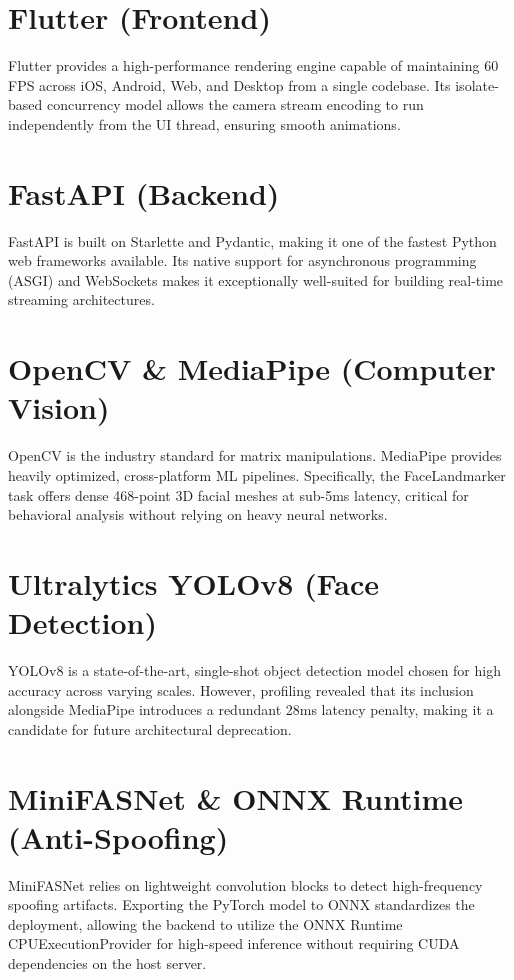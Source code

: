 \documentclass[12pt, a4paper]{report}
\begin{document}

\iffalse

\section{Flutter (Frontend)}
Flutter provides a high-performance rendering engine capable of maintaining 60 FPS across iOS, Android, Web, and Desktop from a single codebase. Its isolate-based concurrency model allows the camera stream encoding to run independently from the UI thread, ensuring smooth animations.

\section{FastAPI (Backend)}
FastAPI is built on Starlette and Pydantic, making it one of the fastest Python web frameworks available. Its native support for asynchronous programming (ASGI) and WebSockets makes it exceptionally well-suited for building real-time streaming architectures.

\section{OpenCV \& MediaPipe (Computer Vision)}
OpenCV is the industry standard for matrix manipulations. MediaPipe provides heavily optimized, cross-platform ML pipelines. Specifically, the FaceLandmarker task offers dense 468-point 3D facial meshes at sub-5ms latency, critical for behavioral analysis without relying on heavy neural networks.

\section{Ultralytics YOLOv8 (Face Detection)}
YOLOv8 is a state-of-the-art, single-shot object detection model chosen for high accuracy across varying scales. However, profiling revealed that its inclusion alongside MediaPipe introduces a redundant 28ms latency penalty, making it a candidate for future architectural deprecation.

\section{MiniFASNet \& ONNX Runtime (Anti-Spoofing)}
MiniFASNet relies on lightweight convolution blocks to detect high-frequency spoofing artifacts. Exporting the PyTorch model to ONNX standardizes the deployment, allowing the backend to utilize the ONNX Runtime CPUExecutionProvider for high-speed inference without requiring CUDA dependencies on the host server.
\end{document}
